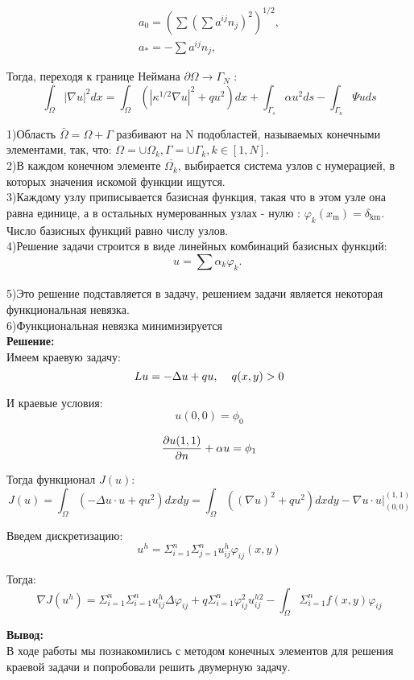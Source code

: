 \documentclass[a4paper, 12pt]{article}%
\begin{document}
	$$
	\begin{gathered}
		a_0=\left(\sum\left(\sum a^{i j} n_j\right)^2\right)^{1 / 2}, \\
		a_*=-\sum a^{i j} n_j,
	\end{gathered}
	$$
	
	Тогда, переходя к границе Неймана $\partial \Omega \rightarrow \Gamma_N$ :
	$$
	\int_{\Omega}|\nabla u|^2 d x=\int_{\Omega}\left(\left|\kappa^{1 / 2} \nabla u\right|^2+q u^2\right) d x+\int_{\Gamma_s} \alpha u^2 d s-\int_{\Gamma_\kappa} \Psi u d s
	$$


	1)Область $\bar{\Omega}=\Omega+\Gamma$ разбивают на $\mathrm{N}$ подобластей, называемых конечными элементами, так, что: $\Omega=\cup \Omega_k, \Gamma=\cup \Gamma_k, k \in[1, N]$.\\
	2)В каждом конечном элементе $\overline{\Omega_k}$, выбирается система узлов с нумерацией, в которых значения искомой функции ищутся.\\
	3)Каждому узлу приписывается базисная функция, такая что в этом узле она равна единице, а в остальных нумерованных узлах - нулю : $\varphi_k\left(x_{\mathrm{m}}\right)=\delta_{\mathrm{km}}$. Число базисных функций равно числу узлов.\\
	4)Решение задачи строится в виде линейных комбинаций базисных функций:
	$$
	u=\sum \alpha_k \varphi_k \text {. }
	$$\\
	5)Это решение подставляется в задачу, решением задачи является некоторая функциональная невязка.\\
	6)Функциональная невязка минимизируется\\
	
	\textbf{Решение: }\\
	Имеем краевую задачу: \\
	$$ Lu = - \Delta u + qu, \hspace{4mm} q(x, y) > 0 $$
	
	И краевые условия: \\
	
	$$ u(0,0) = \phi_0$$
	
	$$ \pdv{u(1,1) }{n} + \alpha u = \phi_1$$
	
	Тогда функционал $J(u): $\\
	
	$$ J(u) = \int_{\Omega} (-\Delta u\cdot u + qu^2 )dxdy = \int_{\Omega} ((\nabla u)^2 + qu^2)dxdy -\nabla u \cdot u \Bigr|_{(0,0)}^{(1,1)}$$ 
	
	Введем дискретизацию:\\
	
	$$ u^h = \Sigma_{i=1}^{n}\Sigma_{j=1}^{n} u_{ij}^h \varphi_{ij}(x,y)$$  
	
	Тогда: \\
	
	$$ \nabla J(u^h) = \Sigma_{i=1}^{n} \Sigma_{i=1}^{n}u_{ij}^h \Delta \varphi_{ij} + q\Sigma_{i=1}^{n}\varphi_{ij}^2 u_{ij}^{h2} - \int_{\Omega} \Sigma_{i=1}^{n} f(x,y) \varphi_{ij}$$
	
	\textbf{Вывод: }\\
	
	В ходе работы мы познакомились с методом конечных элементов для решения краевой задачи и попробовали решить двумерную задачу. 
	
	
	
\end{document}
